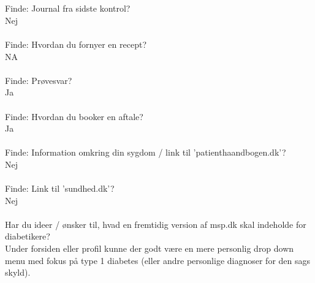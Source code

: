 \\ \\
Finde: Journal fra sidste kontrol?\\
Nej
\\ \\
Finde: Hvordan du fornyer en recept?\\
NA
\\ \\
Finde: Prøvesvar?\\
Ja
\\ \\
Finde: Hvordan du booker en aftale?\\
Ja
\\ \\
Finde: Information omkring din sygdom / link til ’patienthaandbogen.dk’?\\
Nej
\\ \\
Finde: Link til ’sundhed.dk’?\\
Nej
\\ \\
Har du ideer / ønsker til, hvad en fremtidig version af msp.dk skal indeholde for diabetikere?\\
Under forsiden eller profil kunne der godt være en mere personlig drop down menu med fokus på type 1 diabetes (eller andre personlige diagnoser for den sags skyld). 